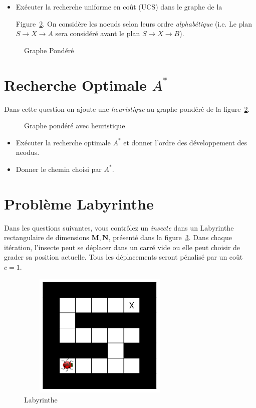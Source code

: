 \documentclass[12pt,letterpaper]{article}
\begin{document}
\begin{itemize}
  \item 
Exécuter la recherche uniforme en coût (UCS) dans le graphe de la
  
Figure~\ref{fig:q4_graph}. On considère les noeuds selon leurs ordre
\emph{alphabétique} (i.e. Le plan $S\rightarrow X \rightarrow A$ sera considéré avant le plan
$S\rightarrow X\rightarrow B$). \end{itemize}

\begin{figure}[htpb]
  \centering
  
  \caption{Graphe Pondéré}
  \label{fig:q4_graph}
\end{figure}


\section*{Recherche Optimale $A^*$}%
\label{sec:recherche_optimale_a_}

Dans cette question on ajoute une \emph{heuristique} au graphe pondéré de la
figure~\ref{fig:q4_graph}.

\begin{figure}[htpb]
  \centering
  
  \caption{Graphe pondéré avec heuristique}
  \label{fig:q4_graph}
\end{figure}
\begin{itemize}
    \item Exécuter la recherche optimale $A^*$ et donner l'ordre des
      développement des neodus.
    \item Donner le chemin choisi par $A^*$.
\end{itemize}

\section*{Problème Labyrinthe}%
\label{sec:section_name}
Dans les questions suivantes, vous contrôlez un \emph{insecte} dans un
Labyrinthe rectangulaire de dimensions $\mathbf{M,N}$, présenté dans la figure~\ref{fig:maze}. Dans chaque
itération, l'insecte peut se déplacer dans un carré vide ou elle peut choisir de
grader sa position actuelle. Tous les déplacements seront pénalisé par un coût
$c=1$.

\begin{figure}[htpb]
  \centering
  \includegraphics[width=8cm,height=6cm]{./hw1_maze1.png}
  \caption{Labyrinthe}
  \label{fig:maze}
\end{figure}
\end{document}
